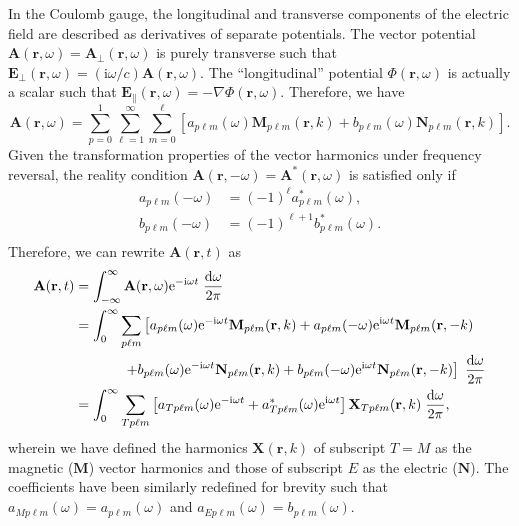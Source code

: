 \documentclass{article}
\numberwithin{equation}{section}
\begin{document}
In the Coulomb gauge, the longitudinal and transverse components of the electric field are described as derivatives of separate potentials. The vector potential $\mathbf{A}(\mathbf{r},\omega) = \mathbf{A}_\perp(\mathbf{r},\omega)$ is purely transverse such that $\mathbf{E}_\perp(\mathbf{r},\omega) = (\mathrm{i}\omega/c)\mathbf{A}(\mathbf{r},\omega)$. The ``longitudinal'' potential $\Phi(\mathbf{r},\omega)$ is actually a scalar such that $\mathbf{E}_\parallel(\mathbf{r},\omega) = -\nabla\Phi(\mathbf{r},\omega)$. Therefore, we have
\begin{equation}
\mathbf{A}(\mathbf{r},\omega) = \sum_{p = 0}^1\sum_{\ell = 1}^\infty\sum_{m = 0}^\ell\left[a_{p\ell m}(\omega)\mathbf{M}_{p\ell m}(\mathbf{r},k) + b_{p\ell m}(\omega)\mathbf{N}_{p\ell m}(\mathbf{r},k)\right].
\end{equation}
Given the transformation properties of the vector harmonics under frequency reversal, the reality condition $\mathbf{A}(\mathbf{r},-\omega) = \mathbf{A}^*(\mathbf{r},\omega)$ is satisfied only if
\begin{equation}
\begin{split}
a_{p\ell m}(-\omega) &= (-1)^\ell a_{p\ell m}^*(\omega),\\
b_{p\ell m}(-\omega) &= (-1)^{\ell + 1} b_{p\ell m}^*(\omega).\\
\end{split}
\end{equation}
Therefore, we can rewrite $\mathbf{A}(\mathbf{r},t)$ as 
\begin{equation}
\begin{split}
\mathbf{A}(\mathbf{r},t) &= \int_{-\infty}^\infty\mathbf{A}(\mathbf{r},\omega)\mathrm{e}^{-\mathrm{i}\omega t}\;\frac{\mathrm{d}\omega}{2\pi}\\
&= \int_0^\infty\sum_{p\ell m}\left[a_{p\ell m}(\omega)\mathrm{e}^{-\mathrm{i}\omega t}\mathbf{M}_{p\ell m}(\mathbf{r},k) + a_{p\ell m}(-\omega)\mathrm{e}^{\mathrm{i}\omega t}\mathbf{M}_{p\ell m}(\mathbf{r},-k)\right.\\
&\hspace{0.1\textwidth}\left. + b_{p\ell m}(\omega)\mathrm{e}^{-\mathrm{i}\omega t}\mathbf{N}_{p\ell m}(\mathbf{r},k) + b_{p\ell m}(-\omega)\mathrm{e}^{\mathrm{i}\omega t}\mathbf{N}_{p\ell m}(\mathbf{r},-k)\right]\;\frac{\mathrm{d}\omega}{2\pi}\\
&= \int_0^\infty\sum_{Tp\ell m}\left[a_{Tp\ell m}(\omega)\mathrm{e}^{-\mathrm{i}\omega t} + a_{Tp\ell m}^*(\omega)\mathrm{e}^{\mathrm{i}\omega t}\right]\mathbf{X}_{Tp\ell m}(\mathbf{r},k)\;\frac{\mathrm{d}\omega}{2\pi},
\end{split}
\end{equation}
wherein we have defined the harmonics $\mathbf{X}(\mathbf{r},k)$ of subscript $T = M$ as the magnetic ($\mathbf{M}$) vector harmonics and those of subscript $E$ as the electric ($\mathbf{N}$). The coefficients have been similarly redefined for brevity such that $a_{Mp\ell m}(\omega) = a_{p\ell m}(\omega)$ and $a_{Ep\ell m}(\omega) = b_{p\ell m}(\omega)$.
\end{document}
